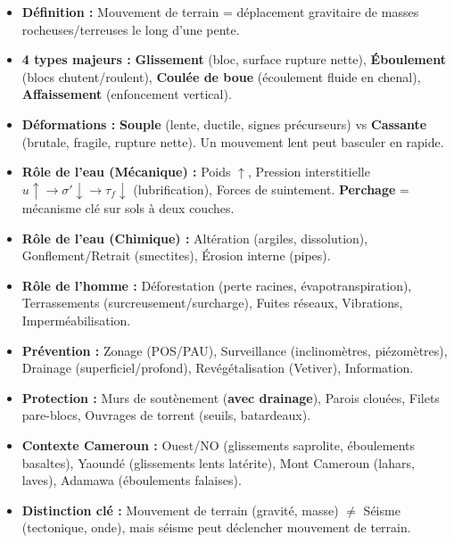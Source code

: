 \documentclass[11pt]{article}
\begin{document}
\begin{aretenir}
\begin{itemize}
    \item \textbf{Définition :} Mouvement de terrain = déplacement gravitaire de masses rocheuses/terreuses le long d'une pente.
    \item \textbf{4 types majeurs :} \textbf{Glissement} (bloc, surface rupture nette), \textbf{Éboulement} (blocs chutent/roulent), \textbf{Coulée de boue} (écoulement fluide en chenal), \textbf{Affaissement} (enfoncement vertical).
    \item \textbf{Déformations :} \textbf{Souple} (lente, ductile, signes précurseurs) vs \textbf{Cassante} (brutale, fragile, rupture nette). Un mouvement lent peut basculer en rapide.
    \item \textbf{Rôle de l'eau (Mécanique) :} Poids $\uparrow$, Pression interstitielle $u \uparrow \rightarrow \sigma' \downarrow \rightarrow \tau_f \downarrow$ (lubrification), Forces de suintement. \textbf{Perchage} = mécanisme clé sur sols à deux couches.
    \item \textbf{Rôle de l'eau (Chimique) :} Altération (argiles, dissolution), Gonflement/Retrait (smectites), Érosion interne (pipes).
    \item \textbf{Rôle de l'homme :} Déforestation (perte racines, évapotranspiration), Terrassements (surcreusement/surcharge), Fuites réseaux, Vibrations, Imperméabilisation.
    \item \textbf{Prévention :} Zonage (POS/PAU), Surveillance (inclinomètres, piézomètres), Drainage (superficiel/profond), Revégétalisation (Vetiver), Information.
    \item \textbf{Protection :} Murs de soutènement (\textbf{avec drainage}), Parois clouées, Filets pare-blocs, Ouvrages de torrent (seuils, batardeaux).
    \item \textbf{Contexte Cameroun :} Ouest/NO (glissements saprolite, éboulements basaltes), Yaoundé (glissements lents latérite), Mont Cameroun (lahars, laves), Adamawa (éboulements falaises).
    \item \textbf{Distinction clé :} Mouvement de terrain (gravité, masse) $\neq$ Séisme (tectonique, onde), mais séisme peut déclencher mouvement de terrain.
\end{itemize}
\end{aretenir}
\end{document}
